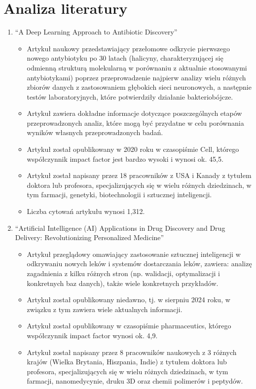 \section{Analiza literatury}
\begin{enumerate}
    \item “A Deep Learning Approach to Antibiotic Discovery”
    \begin{itemize}
        \item Artykuł naukowy przedstawiający przełomowe odkrycie pierwszego nowego antybiotyku po 30 latach (halicyny, charakteryzującej się odmienną strukturą molekularną w porównaniu z aktualnie stosowanymi antybiotykami) poprzez przeprowadzenie najpierw analizy wielu różnych zbiorów danych z zastosowaniem głębokich sieci neuronowych, a następnie testów laboratoryjnych, które potwierdziły działanie bakteriobójcze.
        \item Artykuł zawiera dokładne informacje dotyczące poszczególnych etapów przeprowadzonych analiz, które mogą być przydatne w celu porównania wyników własnych przeprowadzonych badań.
        \item Artykuł został opublikowany w 2020 roku w czasopiśmie Cell, którego współczynnik impact factor jest bardzo wysoki i wynosi ok. 45,5.
        \item Artykuł został napisany przez 18 pracowników z USA i Kanady z tytułem doktora lub profesora, specjalizujących się w wielu różnych dziedzinach, w tym farmacji, genetyki, biotechnologii i sztucznej inteligencji.
        \item Liczba cytowań artykułu wynosi 1,312.
    \end{itemize}
    \item “Artificial Intelligence (AI) Applications in Drug Discovery and Drug Delivery: Revolutionizing Personalized Medicine”
    \begin{itemize}
        \item Artykuł przeglądowy omawiający zastosowanie sztucznej inteligencji w odkrywaniu nowych leków i systemów dostarczania leków, zawiera: analizę zagadnienia z kilku różnych stron (np. walidacji, optymalizacji i konkretnych baz danych),  także wiele konkretnych przykładów.
        \item Artykuł został opublikowany niedawno, tj. w sierpniu 2024 roku, w związku z tym zawiera wiele aktualnych informacji.
        \item Artykuł został opublikowany w czasopiśmie pharmaceutics, którego współczynnik impact factor wynosi ok. 4,9.
        \item Artykuł został napisany przez 8 pracowników naukowych z 3 różnych krajów (Wielka Brytania, Hiszpania, Indie) z tytułem doktora lub profesora, specjalizujących się w wielu różnych dziedzinach, w tym farmacji, nanomedycynie, druku 3D oraz chemii polimerów i peptydów.

\end{itemize}
\end{enumerate}
